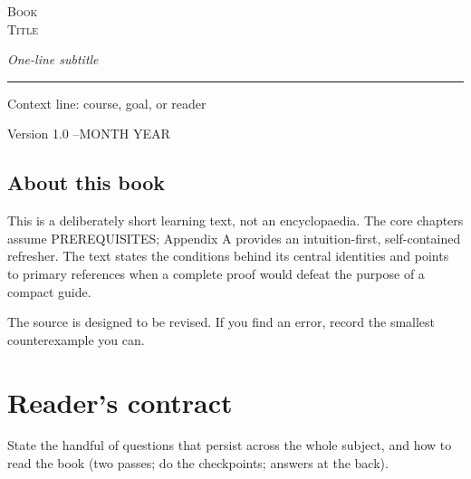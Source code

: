 \begin{titlepage}
\thispagestyle{empty}
\centering
\vspace*{1.0in}
{\small\color{teal}\par}
\vspace{0.45in}
{\fontsize{34}{39}\selectfont\color{navy}\textsc{Book\\Title}\par}
\vspace{0.28in}
{\Large\itshape One-line subtitle\par}
\vspace{0.5in}
{\color{gold}\rule{0.55\linewidth}{1.2pt}\par}
\vspace{0.45in}
{\large Context line: course, goal, or reader\par}
\vfill
{\small Version 1.0 \enspace--\enspace MONTH YEAR\par}
\end{titlepage}

\begin{epubonly}
\chapter*{About this book}
\end{epubonly}

\thispagestyle{empty}
\vspace*{\fill}
\noindent\small
This is a deliberately short learning text, not an encyclopaedia. The core chapters
assume PREREQUISITES; Appendix A provides an intuition-first, self-contained refresher.
The text states the conditions behind its central identities and points to primary
references when a complete proof would defeat the purpose of a compact guide.

\medskip
\noindent The source is designed to be revised. If you find an error, record the smallest
counterexample you can.
\vspace*{\fill}
\clearpage

\tableofcontents
\clearpage

\chapter*{Reader's contract}

State the handful of questions that persist across the whole subject, and how to read
the book (two passes; do the checkpoints; answers at the back).

